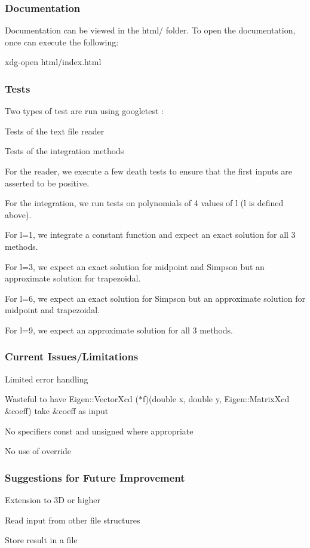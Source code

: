 \subsubsection*{Documentation}

Documentation can be viewed in the {\ttfamily html/} folder. To open the documentation, once can execute the following\+: 
\begin{DoxyCode}
xdg-open html/index.html
\end{DoxyCode}


\subsubsection*{Tests}

Two types of test are run using googletest \+:
\begin{DoxyItemize}
\item Tests of the text file reader
\item Tests of the integration methods
\end{DoxyItemize}

For the reader, we execute a few death tests to ensure that the first inputs are asserted to be positive.

For the integration, we run tests on polynomials of 4 values of l (l is defined above).
\begin{DoxyItemize}
\item For l=1, we integrate a constant function and expect an exact solution for all 3 methods.
\item For l=3, we expect an exact solution for midpoint and Simpson but an approximate solution for trapezoidal.
\item For l=6, we expect an exact solution for Simpson but an approximate solution for midpoint and trapezoidal.
\item For l=9, we expect an approximate solution for all 3 methods.
\end{DoxyItemize}

\subsubsection*{Current Issues/\+Limitations}


\begin{DoxyItemize}
\item Limited error handling
\item Wasteful to have {\ttfamily Eigen\+::\+Vector\+Xcd ($\ast$f)(double x, double y, Eigen\+::\+Matrix\+Xcd \&coeff)} take {\ttfamily \&coeff} as input
\item No specifiers const and unsigned where appropriate
\item No use of override
\end{DoxyItemize}

\subsubsection*{Suggestions for Future Improvement}


\begin{DoxyItemize}
\item Extension to 3D or higher
\item Read input from other file structures
\item Store result in a file 
\end{DoxyItemize}